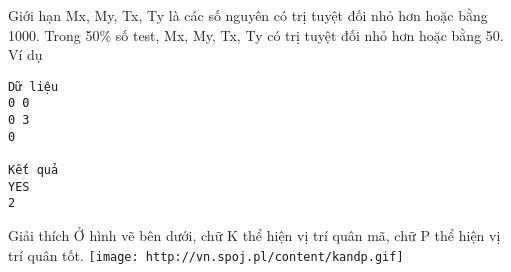 Giới hạn
Mx, My, Tx, Ty là các số nguyên có trị tuyệt đối nhỏ hơn hoặc bằng 1000. Trong 50\% số test, Mx, My, Tx, Ty có trị tuyệt đối nhỏ hơn hoặc bằng 50.
Ví dụ
\begin{verbatim}
Dữ liệu
0 0
0 3
0

Kết quả
YES
2
\end{verbatim}
Giải thích
Ở hình vẽ bên dưới, chữ K thể hiện vị trí quân mã, chữ P thể hiện vị trí quân tốt.  
\texttt{[image: http://vn.spoj.pl/content/kandp.gif]}